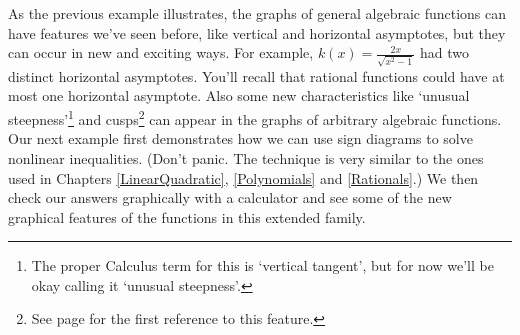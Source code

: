 \documentclass[12pt]{ximera}
\begin{document}
As the previous example illustrates, the graphs of general algebraic functions can have features we've seen before, like vertical and horizontal asymptotes, but they can occur in new and exciting ways. For example, $k(x) = \frac{2x}{\sqrt{x^{2} - 1}}$ had two distinct horizontal asymptotes.  You'll recall that rational functions could have at most one horizontal asymptote.  Also some new characteristics like `unusual steepness'\footnote{The proper Calculus term for this is `vertical tangent', but for now we'll be okay calling it `unusual steepness'.} and cusps\footnote{See page \pageref{cusppicture} for the first reference to this feature.} can appear in the graphs of arbitrary algebraic functions.   Our next example first demonstrates how we can use sign diagrams to solve nonlinear inequalities. (Don't panic.  The technique is very similar to the ones used in Chapters \ref{LinearQuadratic}, \ref{Polynomials} and \ref{Rationals}.)  We then check our answers graphically with a calculator and see some of the new graphical features of the functions in this extended family.
\end{document}
